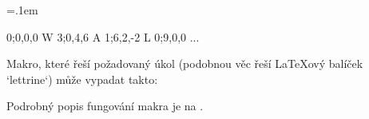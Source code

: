 \begtt
\newdimen\ptem     \ptem=.1em        %
\newdimen\Capsize  {}\ptem  %
\newdimen\Capabove {}\ptem  %
\newdimen\Capafter {}\ptem  %
\def\Capprefix{\localcolor\Red}      %
 
 {0;0,0,0}  %
\declCap W {3;0,4,6} 
\declCap A {1;6,2,-2} 
\declCap L {0;9,0,0} 
... 
\endtt


Makro, které řeší požadovaný úkol (podobnou věc řeší LaTeXový balíček `lettrine`) může vypadat takto: 

\begtt
\def\declCap #1#2{\sxdef{cap:=#1}{#2}} 
\def\Capinsert{\def\leftCapmaterial{}\futurelet\next\CapinsertA} 
\def\CapinsertA{\ifx\next\bgroup \expandafter\CapinsertB \else 
\expandafter\CapinsertC \fi} 
\def\CapinsertB #1{\def\leftCapmaterial{#1}\CapinsertC} 
\def\CapinsertC #1{\par 
  \isdefined{cap:=#1}\iftrue \edef\tmp{\csname cap:=#1\endcsname}%
                     \else   \edef\tmp{\csname cap:=default\endcsname}\fi 
  \setbox0=\hbox{{\thefontsize[\expandafter\ignorept\the\Capsize]\Capprefix#1}\kern\Capafter}%
  \expandafter \CapinsertD \tmp,,%
  \noindent\kern-\firstlineindent \rlap{\kern-\protrudeCap\ptem\llap{\leftCapmaterial}%
                                        \vbox to0pt{\kern-\Capabove\box0\vss}}%
  \kern\firstlineindent 
} 
\def\CapinsertD #1;{\tmpnum=1 \let\firstlineindent=\undefined 
   \def\parshapeparams{}\def\protrudeCap{#1}\CapinsertE} 
\def\CapinsertE #1,{\ifx,#1,\parshape =\tmpnum \parshapeparams 0pt \hsize 
  \else 
     \advance\tmpnum by1 
     \tmpdim=\wd0 \advance\tmpdim by-#1\ptem \advance\tmpdim by-\protrudeCap\ptem 
     \edef\parshapeparams{\parshapeparams\the\tmpdim}%
     \ifx\firstlineindent\undefined \let\firstlineindent\parshapeparams \fi 
     \advance\tmpdim by-\hsize \tmpdim=-\tmpdim 
     \edef\parshapeparams{\parshapeparams\the\tmpdim}%
     \expandafter \CapinsertE \fi 
} 
\endtt


Podrobný popis fungování makra je na . 


 


